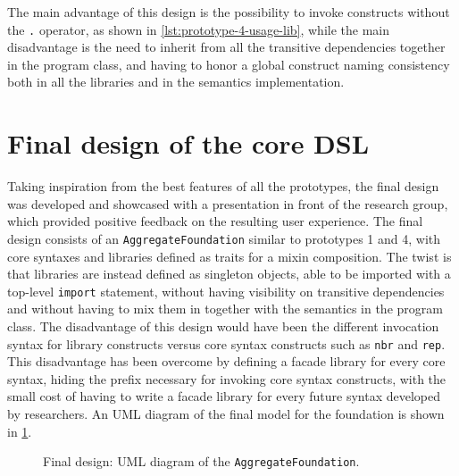 The main advantage of this design is the possibility to invoke constructs without the \texttt{.} operator, as shown in \cref{lst:prototype-4-usage-lib}, while the main disadvantage is the need to inherit from all the transitive dependencies together in the program class, and having to honor a global construct naming consistency both in all the libraries and in the semantics implementation.



\section{Final design of the core DSL} \label{chap:design->sec:final-dsl}

Taking inspiration from the best features of all the prototypes, the final design was developed and showcased with a presentation in front of the research group, which provided positive feedback on the resulting user experience.
%
The final design consists of an \texttt{AggregateFoundation} similar to prototypes 1 and 4, with core syntaxes and libraries defined as traits for a mixin composition.
%
The twist is that libraries are instead defined as singleton objects, able to be imported with a top-level \texttt{import} statement, without having visibility on transitive dependencies and without having to mix them in together with the semantics in the program class.
%
The disadvantage of this design would have been the different invocation syntax for library constructs versus core syntax constructs such as \texttt{nbr} and \texttt{rep}.
%
This disadvantage has been overcome by defining a facade library for every core syntax, hiding the  prefix necessary for invoking core syntax constructs, with the small cost of having to write a facade library for every future syntax developed by researchers.
%
An \ac{UML} diagram of the final model for the foundation is shown in \cref{fig:final-design-foundation-diagram}.

\begin{figure}
    \centering
    \caption{Final design: \ac{UML} diagram of the \texttt{AggregateFoundation}.}
    \label{fig:final-design-foundation-diagram}
    \bigskip
    \resizebox{\linewidth}{!}{
        
    }
\end{figure}

